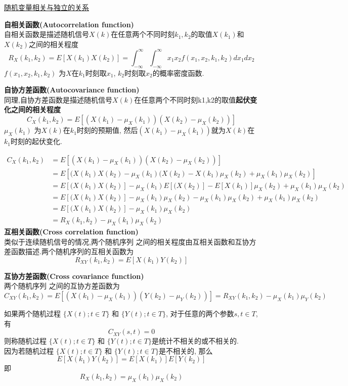 \documentclass{article}
\begin{document}
\href{http://www.cppblog.com/sosi/archive/2010/09/20/127151.html}{随机变量相关与独立的关系}

\textbf{自相关函数(Autocorrelation function)}\\
自相关函数是描述随机信号$X(k)$在任意两个不同时刻$k_1,k_2$的取值$X(k_1) $和$X(k_2) $之间的相关程度
$$
R_X(k_1, k_2)
= E[X(k_1) X(k_2)]
= \int_{-\infty}^{\infty} \int_{-\infty}^{\infty} x_1 x_2 f(x_1, x_2, k_1, k_2)dx_1 dx_2
$$
$f(x_1, x_2, k_1, k_2)$ 为$X$在$k_1$时刻取$x_1$, $k_2$时刻取$x_2$的概率密度函数.

\textbf{自协方差函数(Autocovariance function)}\\
同理,自协方差函数是描述随机信号$X(k)$在任意两个不同时刻k1,k2的取值\textbf{起伏变化之间的相关程度}
$$ C_X(k_1,k_2) = E[(X(k_1) - \mu_X(k_1)) (X(k_2) - \mu_X(k_2))] $$
$\mu_X(k_1)$ 为$X(k)$在$k_1$时刻的预期值, 然后$(X(k_1) - \mu_X(k_1))$就为$X(k)$在$k_1$时刻的起伏变化.

$$
\begin{aligned}
C_X(k_1,k_2)
& = E[(X(k_1) - \mu_X(k_1)) (X(k_2) - \mu_X(k_2))] \\
& = E[(X(k_1) X(k_2) - \mu_X(k_1)(X(k_2) - X(k_1)\mu_X(k_2) + \mu_X(k_1) \mu_X(k_2)] \\
& = E[(X(k_1) X(k_2)] - \mu_X(k_1)E[(X(k_2)] - E[X(k_1)]\mu_X(k_2) + \mu_X(k_1) \mu_X(k_2) \\
& = E[(X(k_1) X(k_2)] - \mu_X(k_1) \mu_X(k_2) - \mu_X(k_1) \mu_X(k_2) + \mu_X(k_1) \mu_X(k_2) \\
& = E[(X(k_1) X(k_2)] - \mu_X(k_1) \mu_X(k_2)\\
& = R_X(k_1, k_2) - \mu_X(k_1) \mu_X(k_2)
\end{aligned}
$$
\textbf{互相关函数(Cross correlation function)}\\
类似于连续随机信号的情况,两个随机序列 之间的相关程度由互相关函数和互协方差函数描述.两个随机序列的互相关函数为
$$ R_{XY}(k_1, k_2) = E[X(k_1) Y(k_2)]$$

\textbf{互协方差函数(Cross covariance function)}\\
两个随机序列 之间的互协方差函数为
$$ C_{XY}(k_1,k_2) = E[(X(k_1) - \mu_X(k_1)) (Y(k_2) - \mu_Y(k_2))] = R_{XY}(k_1,k_2) - \mu_X(k_1) \mu_Y(k_2) $$

如果两个随机过程 $\{X(t); t \in T\}$ 和 $\{Y(t); t \in T\}$,
对于任意的两个参数$s,t \in T$, 有 $$ C_{XY}(s,t) = 0 $$
则称随机过程 $\{X(t); t \in T\}$ 和 $\{Y(t); t \in T\}$是统计不相关的或不相关的.\\
因为若随机过程 $\{X(t); t \in T\}$ 和 $\{Y(t); t \in T\}$是不相关的, 那么
$$ E[X(k_1) Y(k_2)] = E[X(k_1)] E[Y(k_2)] $$
即
$$R_X(k_1, k_2) = \mu_X(k_1) \mu_X(k_2)$$
\end{document}
